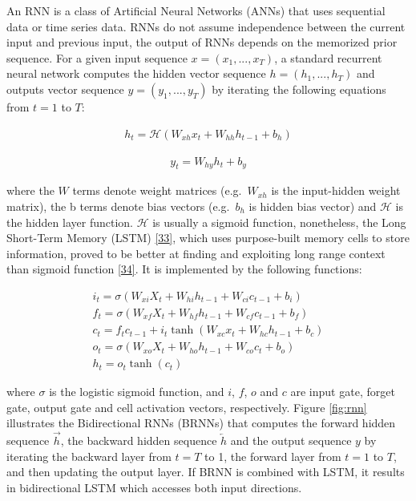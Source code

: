 \documentclass[
  a4paper,
]{article}
\begin{document}
An RNN is a class of Artificial Neural Networks (ANNs) that uses
sequential data or time series data. RNNs do not assume independence
between the current input and previous input, the output of RNNs depends
on the memorized prior sequence. For a given input sequence
\(x = (x_1, ..., x_T)\), a standard recurrent neural network computes
the hidden vector sequence \(h = (h_1, ..., h_T)\) and outputs vector
sequence \(y = (y_1, ..., y_T)\) by iterating the following equations
from \(t= 1\) to \(T\):

\begin{align}
h_t = \mathcal{H}(W_{xh} x_t + W_{hh} h_{t-1} + b_h)
\end{align}

\begin{align}
y_t = W_{hy} h_t + b_y
\end{align}

where the \(W\) terms denote weight matrices (e.g.~\(W_{xh}\) is the
input-hidden weight matrix), the b terms denote bias vectors
(e.g.~\(b_h\) is hidden bias vector) and \(\mathcal{H}\) is the hidden
layer function. \(\mathcal{H}\) is usually a sigmoid function,
nonetheless, the Long Short-Term Memory (LSTM)
\protect\hyperlink{ref-tian2017deep}{{[}33{]}}, which uses purpose-built
memory cells to store information, proved to be better at finding and
exploiting long range context than sigmoid function
\protect\hyperlink{ref-graves2013speech}{{[}34{]}}. It is implemented by
the following functions:

\begin{align}
\textit{$i_t = \sigma(W_{xi} X_t + W_{hi} h_{t-1} + W_{ci} c_{t-1} + b_i)$} \\
f_t = \sigma(W_{xf} X_t + W_{hf} h_{t-1} + W_{cf} c_{t-1} + b_f)\\
c_t = f_t c_{t-1} + i_t \tanh(W_{xc} x_t + W_{hc} h_{t-1} + b_c)\\
o_t = \sigma(W_{xo} X_t + W_{ho} h_{t-1} + W_{co} c_{t} + b_o)\\
h_t = o_t \tanh(c_t)
\end{align}

where \(\sigma\) is the logistic sigmoid function, and \(i\), \(f\),
\(o\) and \(c\) are input gate, forget gate, output gate and cell
activation vectors, respectively. Figure \ref{fig:rnn} illustrates the
Bidirectional RNNs (BRNNs) that computes the forward hidden sequence
\(\overrightarrow{h}\), the backward hidden sequence
\(\overleftarrow{h}\) and the output sequence \(y\) by iterating the
backward layer from \(t = T\) to 1, the forward layer from \(t = 1\) to
\(T\), and then updating the output layer. If BRNN is combined with
LSTM, it results in bidirectional LSTM which accesses both input
directions.
\end{document}
